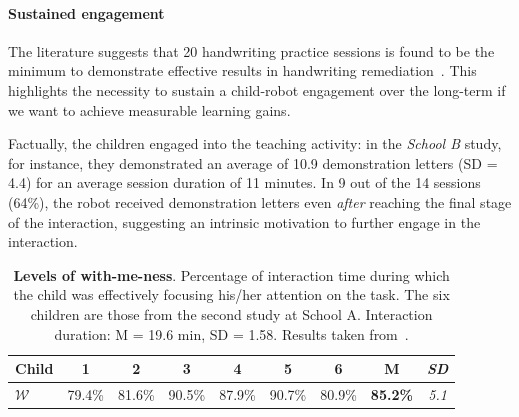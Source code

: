 \documentclass{article}
\begin{document}
\paragraph{Sustained engagement}

The literature suggests that 20 handwriting practice sessions is found to be the
minimum to demonstrate effective results in handwriting
remediation~\cite{Hoy2011}. This highlights the necessity to sustain a
child-robot engagement over the long-term if we want to achieve measurable
learning gains.

Factually, the children engaged into the teaching activity: in the
\textit{School B} study, for instance, they demonstrated an average of 10.9
demonstration letters (SD = 4.4) for an average session duration of 11 minutes.
In 9 out of the 14 sessions (64\%), the robot received demonstration letters
even \emph{after} reaching the final stage of the interaction, suggesting an
intrinsic motivation to further engage in the interaction.


\begin{table}[h!]
    \centering
    \caption{\textbf{Levels of with-me-ness}. Percentage of interaction time
        during which the child was effectively focusing his/her attention on the
        task. The six children are those from the second study at School A.
        Interaction duration: M = 19.6 min, SD = 1.58. Results
        taken from~\cite{lemaignan2016realtime}.}

    \begin{tabular}{p{1cm}cccccccc}
        \toprule
        \bf Child & 1 & 2 & 3 & 4 & 5 & 6 & {\bf M} & {\it SD} \\
        \midrule
        $\mathcal{W}$ & 79.4\% & 81.6\%  & 90.5\% & 87.9\% & 90.7\% & 80.9\% & {\bf 85.2\%} & {\it 5.1} \\ 
        \bottomrule
    \end{tabular}
    \label{tab:results-with-me-ness}
\end{table}
\end{document}
